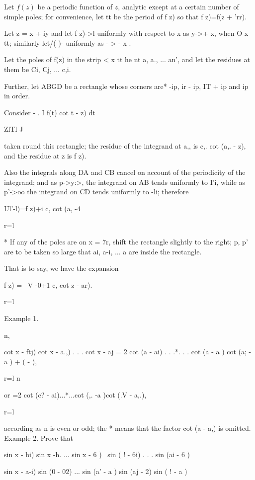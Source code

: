 {

Let $f(z)$ be a periodic function of $z$, analytic except at a certain
number of simple poles; for convenience, let tt be the period of f z)
so that f z)=f(z + 'rr).

Let z = x + iy and let f z)->l uniformly with respect to x as y->+ x,
when O x tt; similarly let/( )- uniformly as - > - x .

Let the poles of f(z) in the strip < x tt he nt a, a., ... an', and
let the residues at them be Ci, Cj, ... c,i.

Further, let ABGD be a rectangle whose corners are* -ip, ir - ip, IT +
ip and ip in order.

Consider - . I f(t) cot t - z) dt

ZlTl J

taken round this rectangle; the residue of the integrand at a,, is
c,. cot (a,. - z), and the residue at z is f z).

Also the integrals along DA and CB cancel on account of the
periodicity of the integrand; and as p->y:>, the integrand on AB tends
uniformly to I'i, while as p'->oo the integrand on CD tends uniformly
to -li; therefore

Ul'-l)=f z)+i c, cot (a, -4

r=l

* If any of the poles are on x = 7r, shift the rectangle slightly to
the right; p, p' are to be taken so large that ai, a-i, ... a are
inside the rectangle.
%
%

That is to say, we have the expansion

f z) = \ V -0+1 c, cot z - ar).

  r=l

Example 1.

n,

cot x - ftj) cot x - a.,) . . . cot x - aj = 2 cot (a - ai) . . .*. .
. cot (a - a ) cot (a; - a ) + ( - ),

r=l n

or =2 cot (c? - ai)...*...cot (,. -a )cot (.V - a,.),

r=l

according as n is even or odd; the * means that the factor cot (a -
a,) is omitted. Example 2. Prove that

sin x - bi) sin x -h. ... sin x - 6 ) \ sin ( ! - 6i) . . . sin (ai -
6 )

sin x - a-i) sin (0 - 02) ... sin (a' - a ) sin (aj - 2)  sin ( ! -
a )

}

